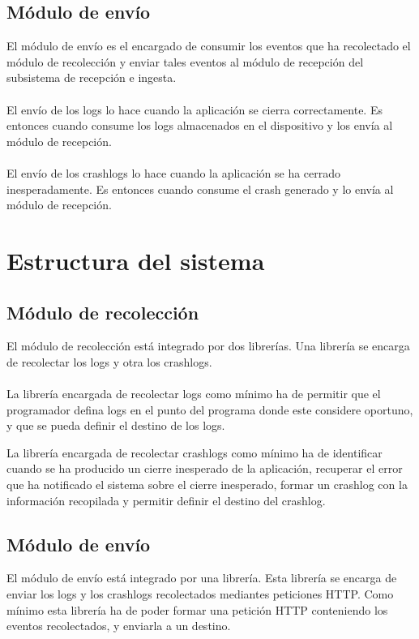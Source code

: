 \subsection{Módulo de envío}
El módulo de envío es el encargado de consumir los eventos que ha recolectado el módulo de recolección y enviar tales eventos al módulo de recepción del subsistema de recepción e ingesta.
\\\\
El envío de los logs lo hace cuando la aplicación se cierra correctamente. Es entonces cuando consume los logs almacenados en el dispositivo y los envía al módulo de recepción.
\\\\
El envío de los crashlogs lo hace cuando la aplicación se ha cerrado inesperadamente. Es entonces cuando consume el crash generado y lo envía al módulo de recepción.

\section{Estructura del sistema}

\subsection{Módulo de recolección}
El módulo de recolección está integrado por dos librerías. Una librería se encarga de recolectar los logs y otra los crashlogs.
\\\\
La librería encargada de recolectar logs como mínimo ha de permitir que el programador defina logs en el punto del programa donde este considere oportuno, y que se pueda definir el destino de los logs.

La librería encargada de recolectar crashlogs como mínimo ha de identificar cuando se ha producido un cierre inesperado de la aplicación, recuperar el error que ha notificado el sistema sobre el cierre inesperado, formar un crashlog con la información recopilada y permitir definir el destino del crashlog.

\subsection{Módulo de envío}
El módulo de envío está integrado por una librería. Esta librería se encarga de enviar los logs y los crashlogs recolectados mediantes peticiones HTTP. Como mínimo esta librería ha de poder formar una petición HTTP conteniendo los eventos recolectados, y enviarla a un destino.

